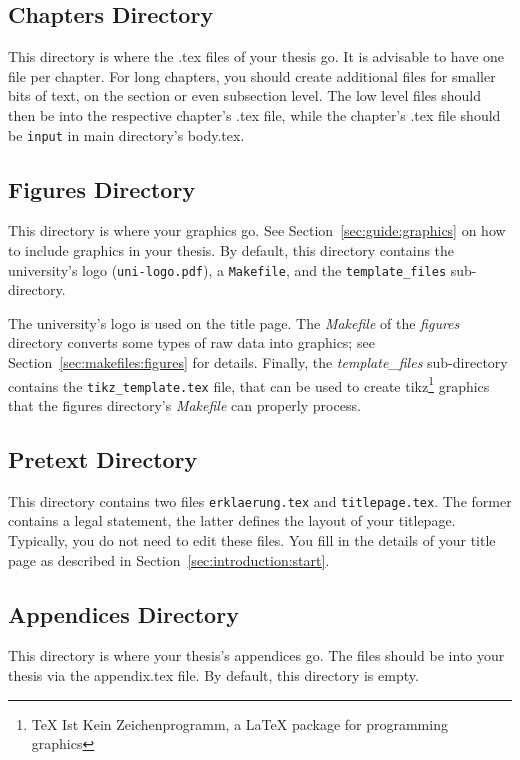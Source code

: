 \subsection{Chapters Directory}
\label{sec:introduction:folders:chapters}
This directory is where the \mbox{.tex} files of your thesis go.
It is advisable to have one file per chapter.
For long chapters, you should create additional files for smaller bits of text,
\eg{} on the section or even subsection level.
The low level files should then be \verb++ into the respective chapter's
\mbox{.tex} file, while the chapter's \mbox{.tex} file should be \verb+input+
in main directory's \mbox{body.tex}.



\subsection{Figures Directory}
\label{sec:introduction:folders:figures}
This directory is where your graphics go.
See Section~\ref{sec:guide:graphics} on how to include graphics in your thesis.
By default, this directory contains the university's logo
(\texttt{uni-logo.pdf}), a \texttt{Makefile}, and the \texttt{template\_files}
sub-directory. 

The university's logo is used on the title page.
The \emph{Makefile} of the \emph{figures} directory converts some types of raw
data into graphics; see Section~\ref{sec:makefiles:figures} for details.
Finally, the \emph{template\_files} sub-directory contains the
\texttt{tikz\_template.tex} file, that can be used to create
tikz\footnote{\TeX{} Ist Kein Zeichenprogramm, a \LaTeX{} package for
programming graphics} graphics that the figures directory's \emph{Makefile} can
properly process.



\subsection{Pretext Directory}
\label{sec:introduction:folders:pretext}
This directory contains two files \texttt{erklaerung.tex} and
\texttt{titlepage.tex}.
The former contains a legal statement, the latter defines the layout of your
titlepage.
Typically, you do not need to edit these files.
You fill in the details of your title page as described in
Section~\ref{sec:introduction:start}.



\subsection{Appendices Directory}
\label{sec:introduction:folders:appendices}
This directory is where your thesis's appendices go.
The files should be \verb++ into your thesis via the \mbox{appendix.tex}
file.
By default, this directory is empty.
